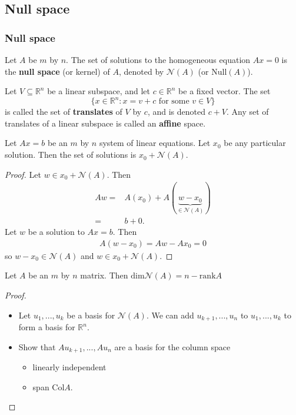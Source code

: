 \documentclass[compress]{beamer}
\def\R{\mathbb{R}}
\newcommand{\rank}{\mathrm{rank}}
\newcommand{\col}{\mathrm{Col}}
\renewcommand{\dim}{\mathrm{dim}}
\begin{document}
\subsection{Null space}
\begin{frame}
  \frametitle{Null space}
  \begin{definition}
    Let $A$ be $m$ by $n$. The set of solutions to the homogeneous
    equation $Ax = 0$ is the \textbf{null space} (or kernel) of
    $A$, denoted by $\mathcal{N}(A)$ (or $\mathrm{Null}(A)$).
  \end{definition}
  
  \begin{definition}
    Let $V \subseteq \R^n$ be a linear subspace, and let $c \in \R^n$ be
    a fixed vector. The set
    \[ \{ x \in \R^n: x = v + c \text{ for some } v \in V \} \]
    is called the set of \textbf{translates} of $V$ by $c$, and is
    denoted $c + V$. Any set of
    translates of a linear subspace is called an \textbf{affine} space. 
  \end{definition}
\end{frame}

\begin{frame}
  \begin{lemma}
    Let $A x = b$ be an $m$ by $n$ system of linear equations. Let $x_0$
    be any particular solution. Then the set of solutions is $x_0 +
    \mathcal{N}(A)$. 
  \end{lemma}
  \begin{proof}
    Let $w \in x_0 + \mathcal{N}(A)$. Then 
    \begin{align*}
      Aw = & A(x_0) + A(\underbrace{w-x_0}_{\in \mathcal{N}(A)}) \\
      = & b + 0.
    \end{align*}
    Let $w$ be a solution to $Ax = b$. Then
    \begin{align*}
      A(w - x_0) = Aw - Ax_0 = 0
    \end{align*}
    so $w - x_0 \in \mathcal{N}(A)$ and $w \in x_0 + \mathcal{N}(A)$. 
  \end{proof}
\end{frame}

\begin{frame}
  \begin{theorem}
    Let $A$ be an $m$ by $n$ matrix. Then 
    $\dim \mathcal{N}(A) = n - \rank A$
  \end{theorem}
  \begin{proof}
    \begin{itemize}
    \item Let $u_1, ..., u_k$ be a basis for $\mathcal{N}(A)$. We can add
      $u_{k+1},...,u_n$ to $u_1, ..., u_k$ to form a basis for
      $\R^n$.
    \item Show that  $A u_{k+1}, ..., A u_n$ are a basis for the
      column space
      \begin{itemize}
      \item linearly independent 
      \item span $\col A$.
      \end{itemize}
    \end{itemize}
  \end{proof}
\end{frame}
\end{document}
